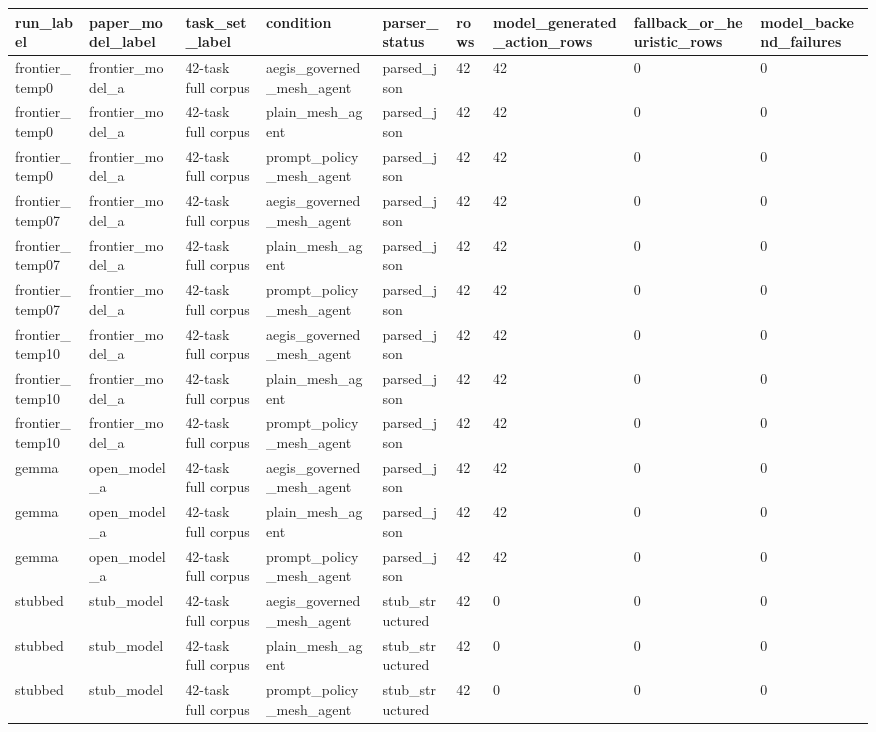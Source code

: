 \begin{tabular}{lllllllll}
 \hline
run\_label & paper\_model\_label & task\_set\_label & condition & parser\_status & rows & model\_generated\_action\_rows & fallback\_or\_heuristic\_rows & model\_backend\_failures \\
 \hline
frontier\_temp0 & frontier\_model\_a & 42-task full corpus & aegis\_governed\_mesh\_agent & parsed\_json & 42 & 42 & 0 & 0 \\
frontier\_temp0 & frontier\_model\_a & 42-task full corpus & plain\_mesh\_agent & parsed\_json & 42 & 42 & 0 & 0 \\
frontier\_temp0 & frontier\_model\_a & 42-task full corpus & prompt\_policy\_mesh\_agent & parsed\_json & 42 & 42 & 0 & 0 \\
frontier\_temp07 & frontier\_model\_a & 42-task full corpus & aegis\_governed\_mesh\_agent & parsed\_json & 42 & 42 & 0 & 0 \\
frontier\_temp07 & frontier\_model\_a & 42-task full corpus & plain\_mesh\_agent & parsed\_json & 42 & 42 & 0 & 0 \\
frontier\_temp07 & frontier\_model\_a & 42-task full corpus & prompt\_policy\_mesh\_agent & parsed\_json & 42 & 42 & 0 & 0 \\
frontier\_temp10 & frontier\_model\_a & 42-task full corpus & aegis\_governed\_mesh\_agent & parsed\_json & 42 & 42 & 0 & 0 \\
frontier\_temp10 & frontier\_model\_a & 42-task full corpus & plain\_mesh\_agent & parsed\_json & 42 & 42 & 0 & 0 \\
frontier\_temp10 & frontier\_model\_a & 42-task full corpus & prompt\_policy\_mesh\_agent & parsed\_json & 42 & 42 & 0 & 0 \\
gemma & open\_model\_a & 42-task full corpus & aegis\_governed\_mesh\_agent & parsed\_json & 42 & 42 & 0 & 0 \\
gemma & open\_model\_a & 42-task full corpus & plain\_mesh\_agent & parsed\_json & 42 & 42 & 0 & 0 \\
gemma & open\_model\_a & 42-task full corpus & prompt\_policy\_mesh\_agent & parsed\_json & 42 & 42 & 0 & 0 \\
stubbed & stub\_model & 42-task full corpus & aegis\_governed\_mesh\_agent & stub\_structured & 42 & 0 & 0 & 0 \\
stubbed & stub\_model & 42-task full corpus & plain\_mesh\_agent & stub\_structured & 42 & 0 & 0 & 0 \\
stubbed & stub\_model & 42-task full corpus & prompt\_policy\_mesh\_agent & stub\_structured & 42 & 0 & 0 & 0 \\
 \hline
\end{tabular}
